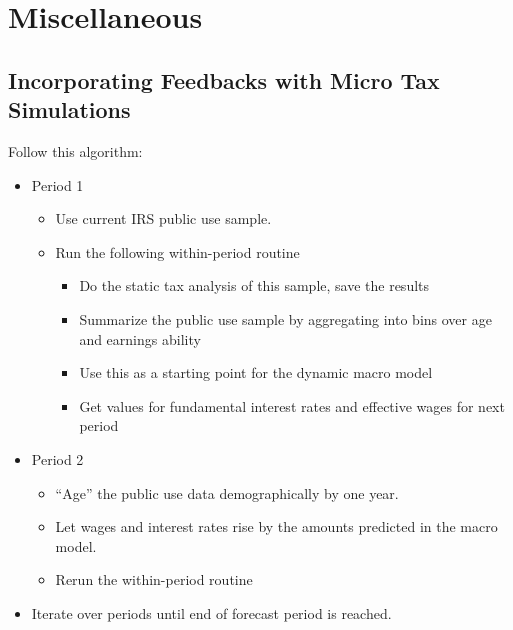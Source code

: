 \documentclass[12pt]{report}
\theoremstyle{definition}
\begin{document}















\chapter{Miscellaneous}
%



\section{Incorporating Feedbacks with Micro Tax Simulations}\label{SecMicro}

  Follow this algorithm:
  \begin{itemize}
    \item Period 1
    \begin{itemize}
      \item Use current IRS public use sample.
      \item Run the following within-period routine
      \begin{itemize}
        \item Do the static tax analysis of this sample, save the results
        \item Summarize the public use sample by aggregating into bins over age and earnings ability
        \item Use this as a starting point for the dynamic macro model
        \item Get values for fundamental interest rates and effective wages for next period
      \end{itemize}
    \end{itemize}
  \item Period 2
    \begin{itemize}
      \item “Age” the public use data demographically by one year.
      \item Let wages and interest rates rise by the amounts predicted in the macro model.
      \item Rerun the within-period routine
    \end{itemize}
  \item Iterate over periods until end of forecast period is reached.
  \end{itemize}
\end{document}
